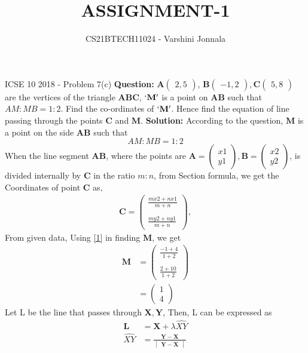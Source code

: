 \documentclass[journal,12pt,twocolumn]{IEEEtran}
\begin{document}
\newcommand{\question}{\noindent \textbf{Question: }}
\newcommand{\solution}{\noindent \textbf{Solution: }}

\newcommand{\mydet}[1]{\ensuremath{\begin{vmatrix}#1\end{vmatrix}}}
\newcommand{\myvec}[1]{\ensuremath{\begin{pmatrix}#1\end{pmatrix}}}

\let\vec\mathbf

\title{ASSIGNMENT-1}
\author{CS21BTECH11024 - Varshini  Jonnala}	
\maketitle
\large{ICSE 10 2018 - Problem 7(c)} \newline
\question $\vec{A}\myvec{2,5}$, $\vec{B}\myvec{-1,2}, \vec{C}\myvec{5,8}$ are the vertices of the triangle $\vec{ABC}$, $\vec{`M'}$ is a point on $\vec{AB}$ such that $AM:MB = 1:2$. Find the co-ordinates of $\vec{`M'}$. Hence find the equation of line passing through the points $\vec{C}$ and $\vec{M}$.
\newline \newline
\solution According to the question, $\vec{M}$ is a point on the side $\vec{AB}$ such that $$AM : MB = 1 : 2$$
 When the line segment $\vec{AB}$, where the points are $\vec{A}=\myvec{x1\\y1}, \vec{B}=\myvec{x2\\y2}$, is divided internally by $\vec{C}$ in the ratio $m:n$, from Section formula,
 we get the Coordinates of point $\vec{C}$ as,
\begin{align} 
\vec{C} = \myvec{\frac{mx2+nx1}{m+n}\\\\ \frac{my2+ny1}{m+n}},\label{1}
\end{align}
From given data, Using \eqref{1} in finding $\vec{M}$, we get
\begin{align}
    \vec{M} &= \myvec{\frac{-1+4}{1+2}\\\\ \frac{2+10}{1+2}}\\  \label{3}
   &= \myvec{1\\4}
\end{align}\newline
 Let L be the line that passes through $\vec{X,Y}$,
    Then, L can be expressed as
\begin{align}
\label{4}
     \vec{L} &= \vec{X} + \lambda\hat{XY} \\
\hat{XY} &= \frac{\vec{Y} - \vec{X}}{\mydet{\vec{Y} - \vec{X}}} \label{5}
\end{align}
\end{document}
